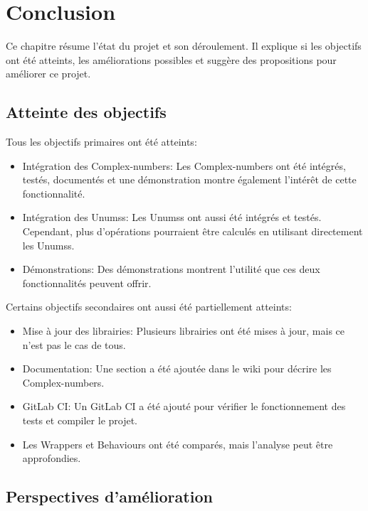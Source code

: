 \section{Conclusion}

Ce chapitre résume l'état du projet et son déroulement. Il explique si les objectifs ont été atteints, les améliorations possibles et suggère des propositions pour améliorer ce projet.

\subsection{Atteinte des objectifs}

Tous les objectifs primaires ont été atteints:

\begin{itemize}
    \item Intégration des \glspl{Complex-number}: Les \glspl{Complex-number} ont été intégrés, testés, documentés et une démonstration montre également l'intérêt de cette fonctionnalité.
    \item Intégration des \glspl{Unums}: Les \glspl{Unums} ont aussi été intégrés et testés. Cependant, plus d'opérations pourraient être calculés en utilisant directement les \glspl{Unums}.
    \item Démonstrations: Des démonstrations montrent l'utilité que ces deux fonctionnalités peuvent offrir.
\end{itemize}

Certains objectifs secondaires ont aussi été partiellement atteints:

\begin{itemize}
    \item Mise à jour des librairies: Plusieurs librairies ont été mises à jour, mais ce n'est pas le cas de tous.
    \item Documentation: Une section a été ajoutée dans le wiki pour décrire les \glspl{Complex-number}.
    \item GitLab CI: Un GitLab CI a été ajouté pour vérifier le fonctionnement des tests et compiler le projet.
    \item Les \glspl{Wrapper} et \glspl{Behaviour} ont été comparés, mais l'analyse peut être approfondies.
\end{itemize}

\subsection{Perspectives d'amélioration}

